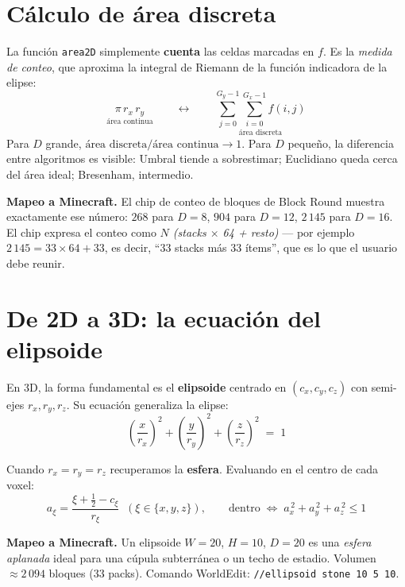 \documentclass[12pt,a4paper]{scrartcl}
\newcommand{\code}[1]{\texttt{\small #1}}
\newcommand{\acc}[1]{\textcolor{accent}{\textbf{#1}}}
\newcommand{\cmd}[1]{\textcolor{earth}{\texttt{\small #1}}}
\begin{document}
\section{Cálculo de área discreta}

La función \code{area2D} simplemente \acc{cuenta} las celdas marcadas en $f$. Es la \emph{medida de conteo}, que aproxima la integral de Riemann de la función indicadora de la elipse:
\[
\underset{\text{área continua}}{\pi \, r_x \, r_y}
\qquad\longleftrightarrow\qquad
\underset{\text{área discreta}}{\sum_{j=0}^{G_y-1}\sum_{i=0}^{G_x-1} f(i,j)}
\]
Para $D$ grande, $\text{área discreta} / \text{área continua} \to 1$. Para $D$ pequeño, la diferencia entre algoritmos es visible: Umbral tiende a sobrestimar; Euclidiano queda cerca del área ideal; Bresenham, intermedio.

\begin{minec}
\textbf{Mapeo a Minecraft.} El chip de conteo de bloques de Block Round muestra exactamente ese número: $268$ para $D=8$, $904$ para $D=12$, $2\,145$ para $D=16$. El chip expresa el conteo como \emph{$N$ (stacks $\times$ 64 + resto)} --- por ejemplo $2\,145 = 33 \times 64 + 33$, es decir, \enquote{$33$ stacks más $33$ ítems}, que es lo que el usuario debe reunir.
\end{minec}

\section{De 2D a 3D: la ecuación del elipsoide}

En 3D, la forma fundamental es el \acc{elipsoide} centrado en $(c_x, c_y, c_z)$ con semi-ejes $r_x, r_y, r_z$. Su ecuación generaliza la elipse:
\[
\left(\dfrac{x}{r_x}\right)^{\!2} + \left(\dfrac{y}{r_y}\right)^{\!2} + \left(\dfrac{z}{r_z}\right)^{\!2} \;=\; 1
\]

Cuando $r_x = r_y = r_z$ recuperamos la \acc{esfera}. Evaluando en el centro de cada voxel:
\[
a_\xi = \frac{\xi + \tfrac{1}{2} - c_\xi}{r_\xi}\;\;(\xi \in \{x,y,z\}),
\qquad
\text{dentro}\;\Longleftrightarrow\;a_x^{\,2} + a_y^{\,2} + a_z^{\,2} \leq 1
\]

\begin{minec}
\textbf{Mapeo a Minecraft.} Un elipsoide $W=20$, $H=10$, $D=20$ es una \emph{esfera aplanada} ideal para una cúpula subterránea o un techo de estadio. Volumen $\approx 2\,094$ bloques ($33$ packs). Comando WorldEdit: \cmd{//ellipsoid stone 10 5 10}.
\end{minec}
\end{document}
